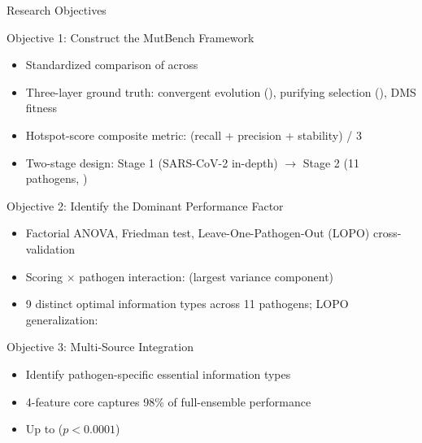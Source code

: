\begin{frame}{Research Objectives}
  \begin{block}{Objective 1: Construct the MutBench Framework}
    \begin{itemize}
      \item Standardized comparison of  across 
      \item Three-layer ground truth: convergent evolution (\cmark), purifying selection (\xmark), DMS fitness
      \item Hotspot-score composite metric: (recall + precision + stability) / 3
      \item Two-stage design: Stage 1 (SARS-CoV-2 in-depth) $\rightarrow$ Stage 2 (11 pathogens, )
    \end{itemize}
  \end{block}
  \begin{block}{Objective 2: Identify the Dominant Performance Factor}
    \begin{itemize}
      \item Factorial ANOVA, Friedman test, Leave-One-Pathogen-Out (LOPO) cross-validation
      \item Scoring $\times$ pathogen interaction:  (largest variance component)
      \item 9 distinct optimal information types across 11 pathogens; LOPO generalization: 
    \end{itemize}
  \end{block}
  \begin{block}{Objective 3: Multi-Source Integration}
    \begin{itemize}
      \item Identify pathogen-specific essential information types
      \item 4-feature core captures 98\% of full-ensemble performance
      \item Up to  ($p < 0.0001$)
    \end{itemize}
  \end{block}
\end{frame}

